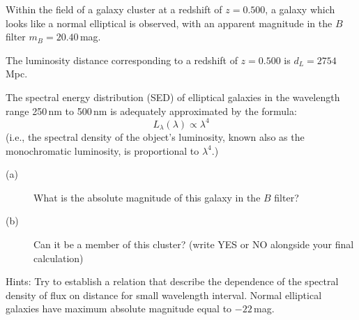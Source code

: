 Within the field of a galaxy cluster at a redshift of $z = 0.500$, a galaxy
which looks like a normal elliptical is observed, with an apparent magnitude in
the $B$ filter $m_B = 20.40$\,mag.

The luminosity distance corresponding to a redshift of $z = 0.500$ is
$d_L = 2754$\,Mpc.

The spectral energy distribution (SED) of elliptical galaxies in the wavelength
range 250\,nm to 500\,nm is adequately approximated by the formula:
\[ L_\lambda(\lambda) \propto \lambda^4 \]
(i.e., the spectral density of the object's luminosity, known also as the
monochromatic luminosity, is proportional to $\lambda^4$.)

\begin{description}
\item[(a)] What is the absolute magnitude of this galaxy in the $B$ filter?
\item[(b)] Can it be a member of this cluster? (write YES or NO alongside your
  final calculation)
\end{description}

Hints: Try to establish a relation that describe the dependence of the spectral
density of flux on distance for small wavelength interval. Normal elliptical
galaxies have maximum absolute magnitude equal to $-22$\,mag.

